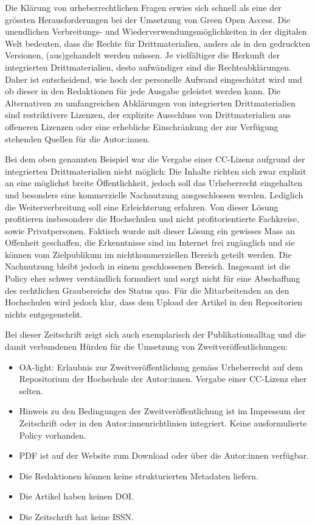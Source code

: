 \documentclass[a4paper,
fontsize=11pt,
oneside,
numbers=noperiodatend,
parskip=half-,
bibliography=totoc,
final
]{scrartcl}
\begin{document}
Die Klärung von urheberrechtlichen Fragen erwies sich schnell als eine
der grössten Herausforderungen bei der Umsetzung von Green Open Access.
Die unendlichen Verbreitungs- und Wiederverwendungsmöglichkeiten in der
digitalen Welt bedeuten, dass die Rechte für Drittmaterialien, anders
als in den gedruckten Versionen, (aus)gehandelt werden müssen. Je
vielfältiger die Herkunft der integrierten Drittmaterialien, desto
aufwändiger sind die Rechteabklärungen. Daher ist entscheidend, wie hoch
der personelle Aufwand eingeschätzt wird und ob dieser in den
Redaktionen für jede Ausgabe geleistet werden kann. Die Alternativen zu
umfangreichen Abklärungen von integrierten Drittmaterialien sind
restriktivere Lizenzen, der explizite Ausschluss von Drittmaterialien
aus offeneren Lizenzen oder eine erhebliche Einschränkung der zur
Verfügung stehenden Quellen für die Autor:innen.

Bei dem oben genannten Beispiel war die Vergabe einer CC-Lizenz aufgrund
der integrierten Drittmaterialien nicht möglich: Die Inhalte richten
sich zwar explizit an eine möglichst breite Öffentlichkeit, jedoch soll
das Urheberrecht eingehalten und besonders eine kommerzielle Nachnutzung
ausgeschlossen werden. Lediglich die Weiterverbreitung soll eine
Erleichterung erfahren. Von dieser Lösung profitieren insbesondere die
Hochschulen und nicht profitorientierte Fachkreise, sowie
Privatpersonen. Faktisch wurde mit dieser Lösung ein gewisses Mass an
Offenheit geschaffen, die Erkenntnisse sind im Internet frei zugänglich
und sie können vom Zielpublikum im nichtkommerziellen Bereich geteilt
werden. Die Nachnutzung bleibt jedoch in einem geschlossenen Bereich.
Insgesamt ist die Policy eher schwer verständlich formuliert und sorgt
nicht für eine Abschaffung des rechtlichen Graubereichs des Status quo.
Für die Mitarbeitenden an den Hochschulen wird jedoch klar, dass dem
Upload der Artikel in den Repositorien nichts entgegensteht.

Bei dieser Zeitschrift zeigt sich auch exemplarisch der
Publikationsalltag und die damit verbundenen Hürden für die Umsetzung
von Zweitveröffentlichungen:

\begin{itemize}
\item
  OA-light: Erlaubnis zur Zweitveröffentlichung gemäss Urheberrecht auf
  dem Repositorium der Hochschule der Autor:innen. Vergabe einer
  CC-Lizenz eher selten.
\item
  Hinweis zu den Bedingungen der Zweitveröffentlichung ist im Impressum
  der Zeitschrift oder in den Autor:innenrichtlinien integriert. Keine
  ausformulierte Policy vorhanden.
\item
  PDF ist auf der Website zum Download oder über die Autor:innen
  verfügbar.
\item
  Die Redaktionen können keine strukturierten Metadaten liefern.
\item
  Die Artikel haben keinen DOI.
\item
  Die Zeitschrift hat keine ISSN.
\end{itemize}
\end{document}
